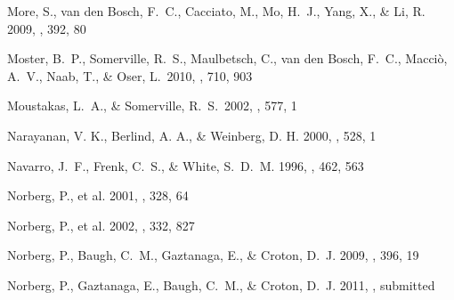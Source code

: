 \documentclass[]{emulateapj}
\begin{document}
\begin{thebibliography}{999}

More, S., van den Bosch, F.\ C., Cacciato, M., Mo, H.\ J., Yang, X.,
\&  Li, R. 2009, \mnras, 392, 80

Moster, B.~P., Somerville, R.~S., Maulbetsch, C., van den Bosch, F.~C., 
Macci{\`o}, A.~V., Naab, T., \& Oser, L.\ 2010, \apj, 710, 903 

Moustakas, L.\ A., \& Somerville, R.\ S.\ 2002, \apj, 577, 1


Narayanan, V. K., Berlind, A. A., \& Weinberg, D. H. 2000, \apj, 528, 1


Navarro, J.\ F., Frenk, C.\ S., \& White, S.\ D.\ M. 1996, \apj, 462, 563


Norberg, P., et al. 2001, \mnras, 328, 64

Norberg, P., et al. 2002, \mnras, 332, 827

Norberg, P., Baugh, C.\ M., Gaztanaga, E., \& Croton, D.\ J. 2009,
\mnras, 396, 19

Norberg, P., Gaztanaga, E., Baugh, C.\ M., \& Croton, D.\ J. 2011,
\mnras, submitted


\end{thebibliography}
\end{document}
